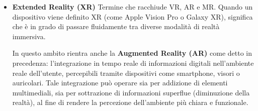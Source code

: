\begin{itemize}
     dove AV è Augmented Virtuality, una tecnologia di MR in cui l'ambiente generato al computer viene arricchito da oggetti del mondo fisico. 
    
    \item \textbf{Extended Reality (XR)} \newline
    Termine che racchiude VR, AR e MR. Quando un dispositivo viene definito XR (come Apple Vision Pro o Galaxy XR), significa che è in grado di passare fluidamente tra diverse modalità di realtà immersiva. 
    
    In questo ambito rientra anche la \textbf{Augmented Reality (AR)} come detto in precedenza: l'integrazione in tempo reale di informazioni digitali nell'ambiente reale dell'utente, percepibili tramite dispositivi come smartphone, visori o auricolari. Tale integrazione può operare sia per addizione di elementi multimediali, sia per sottrazione di informazioni superflue (diminuzione della realtà), al fine di rendere la percezione dell'ambiente più chiara e funzionale.
    
\end{itemize}



